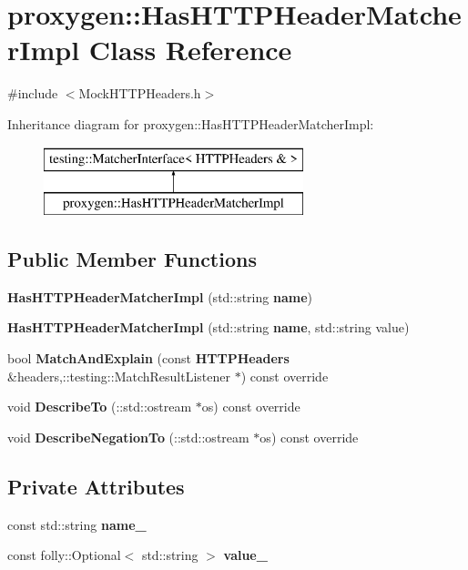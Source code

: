 \section{proxygen\+:\+:Has\+H\+T\+T\+P\+Header\+Matcher\+Impl Class Reference}
\label{classproxygen_1_1HasHTTPHeaderMatcherImpl}


{\ttfamily \#include $<$Mock\+H\+T\+T\+P\+Headers.\+h$>$}

Inheritance diagram for proxygen\+:\+:Has\+H\+T\+T\+P\+Header\+Matcher\+Impl\+:\begin{figure}[H]
\begin{center}
\leavevmode
\includegraphics[height=2.000000cm]{classproxygen_1_1HasHTTPHeaderMatcherImpl}
\end{center}
\end{figure}
\subsection*{Public Member Functions}
\begin{DoxyCompactItemize}
\item 
{\bf Has\+H\+T\+T\+P\+Header\+Matcher\+Impl} (std\+::string {\bf name})
\item 
{\bf Has\+H\+T\+T\+P\+Header\+Matcher\+Impl} (std\+::string {\bf name}, std\+::string value)
\item 
bool {\bf Match\+And\+Explain} (const {\bf H\+T\+T\+P\+Headers} \&headers,\+::testing\+::\+Match\+Result\+Listener $\ast$) const override
\item 
void {\bf Describe\+To} (\+::std\+::ostream $\ast$os) const override
\item 
void {\bf Describe\+Negation\+To} (\+::std\+::ostream $\ast$os) const override
\end{DoxyCompactItemize}
\subsection*{Private Attributes}
\begin{DoxyCompactItemize}
\item 
const std\+::string {\bf name\+\_\+}
\item 
const folly\+::\+Optional$<$ std\+::string $>$ {\bf value\+\_\+}
\end{DoxyCompactItemize}


